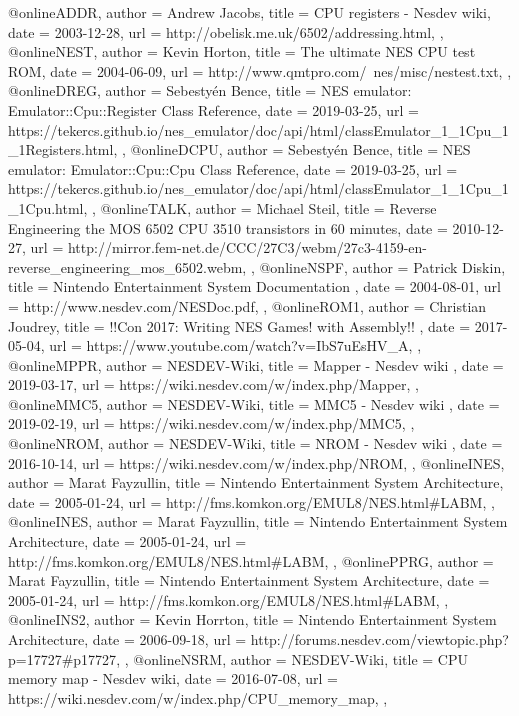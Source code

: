 @online{ADDR,
	author = {Andrew Jacobs},
	title = {CPU registers - Nesdev wiki},
	date = {2003-12-28},
	url = {http://obelisk.me.uk/6502/addressing.html},
},
@online{NEST,
	author = {Kevin Horton},
	title = {The ultimate NES CPU test ROM},
	date = {2004-06-09},
	url = {http://www.qmtpro.com/~nes/misc/nestest.txt},
},
@online{DREG,
	author = {Sebestyén Bence},
	title = {NES emulator: Emulator::Cpu::Register Class Reference},
	date = {2019-03-25},
	url = {https://tekercs.github.io/nes_emulator/doc/api/html/classEmulator_1_1Cpu_1_1Registers.html},
},
@online{DCPU,
	author = {Sebestyén Bence},
	title = {NES emulator: Emulator::Cpu::Cpu Class Reference},
	date = {2019-03-25},
	url = {https://tekercs.github.io/nes_emulator/doc/api/html/classEmulator_1_1Cpu_1_1Cpu.html},
},
@online{TALK,
	author = {Michael Steil},
	title = {Reverse Engineering the MOS 6502 CPU 3510 transistors in 60 minutes},
	date = {2010-12-27},
	url = {http://mirror.fem-net.de/CCC/27C3/webm/27c3-4159-en-reverse_engineering_mos_6502.webm},
},
@online{NSPF,
	author = {Patrick Diskin},
	title = {Nintendo Entertainment System Documentation },
	date = {2004-08-01},
	url = {http://www.nesdev.com/NESDoc.pdf},
},
@online{ROM1,
	author = {Christian Joudrey},
	title = {!!Con 2017: Writing NES Games! with Assembly!! },
	date = {2017-05-04},
	url = {https://www.youtube.com/watch?v=IbS7uEsHV_A},
},
@online{MPPR,
	author = {NESDEV-Wiki},
	title = {Mapper - Nesdev wiki },
	date = {2019-03-17},
	url = {https://wiki.nesdev.com/w/index.php/Mapper},
},
@online{MMC5,
	author = {NESDEV-Wiki},
	title = {MMC5 - Nesdev wiki },
	date = {2019-02-19},
	url = {https://wiki.nesdev.com/w/index.php/MMC5},
},
@online{NROM,
	author = {NESDEV-Wiki},
	title = {NROM - Nesdev wiki },
	date = {2016-10-14},
	url = {https://wiki.nesdev.com/w/index.php/NROM},
},
@online{INES,
	author = {Marat Fayzullin},
	title = {Nintendo Entertainment System Architecture},
	date = {2005-01-24},
	url = {http://fms.komkon.org/EMUL8/NES.html#LABM},
},
@online{INES,
	author = {Marat Fayzullin},
	title = {Nintendo Entertainment System Architecture},
	date = {2005-01-24},
	url = {http://fms.komkon.org/EMUL8/NES.html#LABM},
},
@online{PPRG,
	author = {Marat Fayzullin},
	title = {Nintendo Entertainment System Architecture},
	date = {2005-01-24},
	url = {http://fms.komkon.org/EMUL8/NES.html#LABM},
},
@online{INS2,
	author = {Kevin Horrton},
	title = {Nintendo Entertainment System Architecture},
	date = {2006-09-18},
	url = {http://forums.nesdev.com/viewtopic.php?p=17727#p17727},
},
@online{NSRM,
	author = {NESDEV-Wiki},
	title = {CPU memory map - Nesdev wiki},
	date = {2016-07-08},
	url = {https://wiki.nesdev.com/w/index.php/CPU_memory_map},
},

